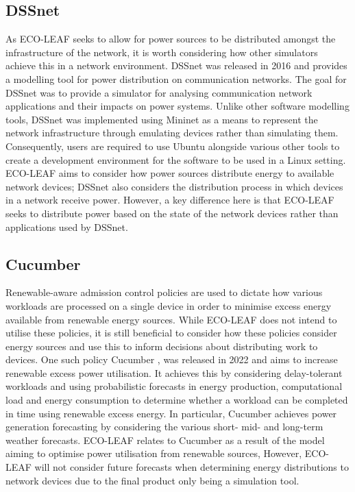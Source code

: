 \documentclass{l4proj}
\begin{document}
\subsection{DSSnet}
As ECO-LEAF seeks to allow for power sources to be distributed amongst the infrastructure of the network, it is worth considering how other simulators achieve this in a network environment.
DSSnet \citep{dssNet} was released in 2016 and provides a modelling tool for power distribution on communication networks.
The goal for DSSnet was to provide a simulator for analysing communication network applications and their impacts on power systems.
Unlike other software modelling tools, DSSnet was implemented using Mininet \citep{mininet} as a means to represent the network infrastructure through emulating devices rather than simulating them.
Consequently, users are required to use Ubuntu alongside various other tools to create a development environment for the software to be used in a Linux setting.
ECO-LEAF aims to consider how power sources distribute energy to available network devices; DSSnet also considers the distribution process in which devices in a network receive power.
However, a key difference here is that ECO-LEAF seeks to distribute power based on the state of the network devices rather than applications used by DSSnet.

\subsection{Cucumber}
Renewable-aware admission control policies are used to dictate how various workloads are processed on a single device in order to minimise excess energy available from renewable energy sources.
While ECO-LEAF does not intend to utilise these policies, it is still beneficial to consider how these policies consider energy sources and use this to inform decisions about distributing work to devices.
One such policy Cucumber \citep{cucumber}, was released in 2022 and aims to increase renewable excess power utilisation.
It achieves this by considering delay-tolerant workloads and using probabilistic forecasts in energy production, computational load and energy consumption to determine whether a workload can be completed in time using renewable excess energy.
In particular, Cucumber achieves power generation forecasting by considering the various short- mid- and long-term weather forecasts.
ECO-LEAF relates to Cucumber as a result of the model aiming to optimise power utilisation from renewable sources,
However, ECO-LEAF will not consider future forecasts when determining energy distributions to network devices due to the final product only being a simulation tool.
\end{document}
